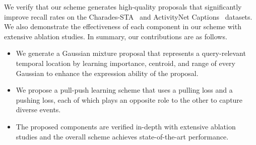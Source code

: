 We verify that our scheme generates high-quality proposals that significantly improve recall rates on the Charades-STA~\cite{gao2017tall} and ActivityNet Captions~\cite{krishna2017dense} datasets.
We also demonstrate the effectiveness of each component in our scheme with extensive ablation studies.
In summary, our contributions are as follows.
\begin{itemize}
\item We generate a Gaussian mixture proposal that represents a query-relevant temporal location by learning importance, centroid, and range of every Gaussian to enhance the expression ability of the proposal.
\item We propose a pull-push learning scheme that uses a pulling loss and a pushing loss, each of which plays an opposite role to the other to capture diverse events.
\item The proposed components are verified in-depth with extensive ablation studies and the overall scheme achieves state-of-the-art performance. 
\end{itemize}
